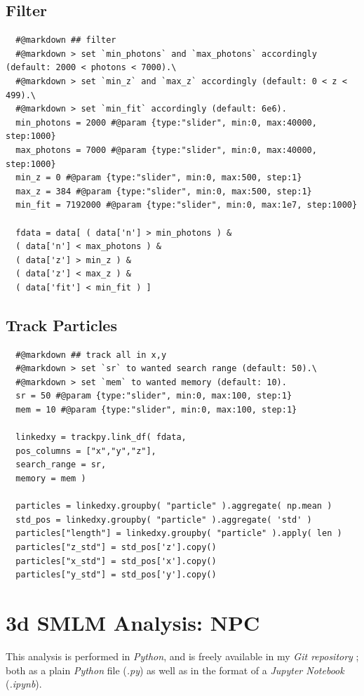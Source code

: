 \documentclass[11pt, a4paper, oneside, twocolumn]{report}
\newcommand{\e}{\emph}
\newcommand{\x}[1]{#1\index{#1}}
\begin{document}
\subsection{Filter}

\begin{verbatim}
  #@markdown ## filter
  #@markdown > set `min_photons` and `max_photons` accordingly (default: 2000 < photons < 7000).\
  #@markdown > set `min_z` and `max_z` accordingly (default: 0 < z < 499).\
  #@markdown > set `min_fit` accordingly (default: 6e6).
  min_photons = 2000 #@param {type:"slider", min:0, max:40000, step:1000}
  max_photons = 7000 #@param {type:"slider", min:0, max:40000, step:1000}
  min_z = 0 #@param {type:"slider", min:0, max:500, step:1}
  max_z = 384 #@param {type:"slider", min:0, max:500, step:1}
  min_fit = 7192000 #@param {type:"slider", min:0, max:1e7, step:1000}
  
  fdata = data[ ( data['n'] > min_photons ) &
  ( data['n'] < max_photons ) & 
  ( data['z'] > min_z ) &
  ( data['z'] < max_z ) &
  ( data['fit'] < min_fit ) ]
\end{verbatim}


\subsection{Track Particles}

\begin{verbatim}
  #@markdown ## track all in x,y
  #@markdown > set `sr` to wanted search range (default: 50).\
  #@markdown > set `mem` to wanted memory (default: 10).
  sr = 50 #@param {type:"slider", min:0, max:100, step:1}
  mem = 10 #@param {type:"slider", min:0, max:100, step:1}
  
  linkedxy = trackpy.link_df( fdata,
  pos_columns = ["x","y","z"],
  search_range = sr,
  memory = mem )
  
  particles = linkedxy.groupby( "particle" ).aggregate( np.mean )
  std_pos = linkedxy.groupby( "particle" ).aggregate( 'std' )
  particles["length"] = linkedxy.groupby( "particle" ).apply( len )
  particles["z_std"] = std_pos['z'].copy()
  particles["x_std"] = std_pos['x'].copy()
  particles["y_std"] = std_pos['y'].copy()
\end{verbatim}


\clearpage\section{3d SMLM Analysis: NPC}

This analysis is performed in \e{\x{Python}}, and is freely available
in my \e{Git repository} \cite{sie21}; both as a plain \e{Python} file
(\e{.py}) as well as in the format of a \e{\x{Jupyter Notebook}}
(\e{.ipynb}).
\end{document}
